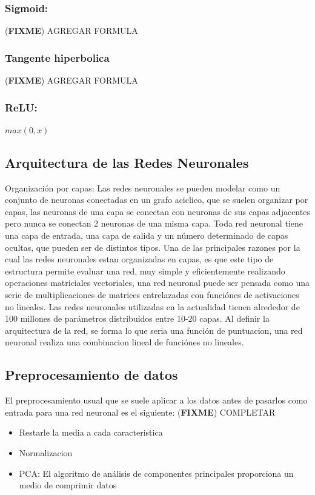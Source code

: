 \documentclass[a4paper,11pt,spanish]{book}
\newcommand*{\FIXME}[1]{{(\textbf{FIXME}) {#1}}}
\begin{document}
	  \subsubsection {Sigmoid:} \FIXME{AGREGAR FORMULA}
	  \subsubsection {Tangente hiperbolica} \FIXME{AGREGAR FORMULA}
	  \subsubsection {ReLU:}$max(0,x)$

    \subsection {Arquitectura de las Redes Neuronales}
      Organización por capas: Las redes neuronales se pueden modelar como un conjunto de neuronas conectadas en un grafo aciclico, que se suelen organizar por capas, las neuronas de una capa
      se conectan con neuronas de sus capas adjacentes pero nunca se conectan 2 neuronas de una misma capa.
      Toda red neuronal tiene una capa de entrada, una capa de salida y un número determinado de capas ocultas, que pueden ser de distintos tipos.
      Una de las principales razones por la cual las redes neuronales estan organizadas en capas, es que este tipo de estructura permite evaluar una red, muy simple y eficientemente realizando
      operaciones matriciales vectoriales, una red neuronal puede ser pensada como una serie de multiplicaciones de matrices entrelazadas con funciónes de activaciones no lineales.
      Las redes neuronales utilizadas en la actualidad tienen alrededor de 100 millones de parámetros distribuidos entre 10-20 capas.
      Al definir la arquitectura de la red, se forma lo que seria una función de puntuacion, una red neuronal realiza una combinacion lineal de funciónes no lineales. 

    \subsection {Preprocesamiento de datos}
      El preprocesamiento usual que se suele aplicar a los datos antes de pasarlos como entrada para una red neuronal es el siguiente: 
      \FIXME{COMPLETAR}
      \begin{itemize}
       \item Restarle la media a cada caracteristica 
       \item Normalizacion
       \item PCA: El algoritmo de análisis de componentes principales proporciona un medio de comprimir datos
      \end{itemize}
\end{document}
